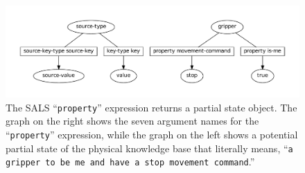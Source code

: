 \begin{figure}
\centering
\includegraphics[width=12cm]{gfx/property_partial_state_graph}
\caption[The SALS ``{\tt{property}}'' expression returns a partial
  state object.]{The SALS ``{\tt{property}}'' expression returns a
  partial state object.  The graph on the right shows the seven
  argument names for the ``{\tt{property}}'' expression, while the
  graph on the left shows a potential partial state of the physical
  knowledge base that literally means, ``{\tt{a gripper to be me and
      have a stop movement command}}.''}
\label{figure:property_partial_state_graph}
\end{figure}

